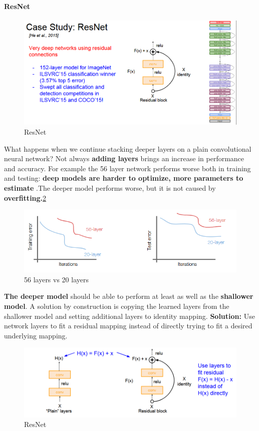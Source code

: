 \documentclass[11pt]{article}
\begin{document}
\paragraph{ResNet}
\begin{figure}[h]
\centering
\captionsetup{justification=centering}
\includegraphics[width=0.9\linewidth]{L815.pdf}
\caption{ ResNet}
\label{fig:L815}
\end{figure}
What happens when we continue stacking deeper layers on a plain convolutional neural network?
Not always \textbf{adding layers} brings an increase in performance and accuracy. For example the 56 layer network performs worse both in training and testing: \textbf{deep models are harder to optimize, more parameters to estimate }.The deeper model performs worse, but it is not caused by \textbf{overfitting.}\ref{fig:L816}
\clearpage
\begin{figure}[h]
\centering
\captionsetup{justification=centering}
\includegraphics[width=0.9\linewidth]{L816.pdf}
\caption{ 56 layers vs 20 layers}
\label{fig:L816}
\end{figure}
\textbf{The deeper model} should be able to perform at least as well as the \textbf{shallower model}. A solution by construction is copying the learned layers from the shallower model and setting additional layers to identity mapping. \textbf{Solution:} Use network layers to fit a residual mapping instead of directly trying to fit a desired underlying mapping.
\begin{figure}[h]
\centering
\captionsetup{justification=centering}
\includegraphics[width=0.9\linewidth]{L817.pdf}
\caption{ ResNet}
\label{fig:L817}
\end{figure}\\
\end{document}
